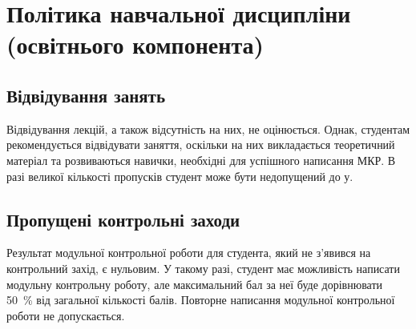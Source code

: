 \documentclass{Syllabus}
\begin{document}
\clearpage
{}

\section{Політика навчальної дисципліни (освітнього компонента)}


\subsection*{Відвідування занять}
Відвідування лекцій, а також відсутність на них, не оцінюється. Однак, студентам рекомендується відвідувати заняття, оскільки на них викладається теоретичний матеріал та розвиваються навички, необхідні для успішного написання МКР. В разі великої кількості пропусків студент може бути недопущений до \control у.

\subsection*{Пропущені контрольні заходи}

Результат модульної контрольної роботи для студента, який не з’явився на контрольний захід, є нульовим. У такому разі, студент має можливість написати модульну контрольну роботу, але максимальний бал за неї буде дорівнювати 50~\% від загальної кількості балів. Повторне написання модульної контрольної роботи не допускається.
\end{document}
